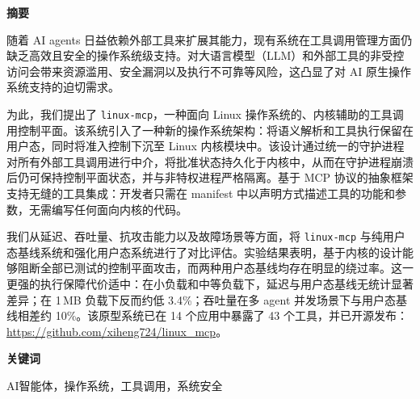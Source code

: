 \onehalfspacing
{\fontsize{16pt}{30pt}\selectfont \noindent\textbf{摘要}}
\vspace{0.7cm}
{\fontsize{12pt}{18pt}\selectfont

随着 AI agents 日益依赖外部工具来扩展其能力，现有系统在工具调用管理方面仍缺乏高效且安全的操作系统级支持。对大语言模型（LLM）和外部工具的非受控访问会带来资源滥用、安全漏洞以及执行不可靠等风险，这凸显了对 AI 原生操作系统支持的迫切需求。

为此，我们提出了 \texttt{linux-mcp}，一种面向 Linux 操作系统的、内核辅助的工具调用控制平面。该系统引入了一种新的操作系统架构：将语义解析和工具执行保留在用户态，同时将准入控制下沉至 Linux 内核模块中。该设计通过统一的守护进程对所有外部工具调用进行中介，将批准状态持久化于内核中，从而在守护进程崩溃后仍可保持控制平面状态，并与非特权进程严格隔离。基于 MCP 协议的抽象框架支持无缝的工具集成：开发者只需在 manifest 中以声明方式描述工具的功能和参数，无需编写任何面向内核的代码。

我们从延迟、吞吐量、抗攻击能力以及故障场景等方面，将 \texttt{linux-mcp} 与纯用户态基线系统和强化用户态系统进行了对比评估。实验结果表明，基于内核的设计能够阻断全部已测试的控制平面攻击，而两种用户态基线均存在明显的绕过率。这一更强的执行保障代价适中：在小负载和中等负载下，延迟与用户态基线无统计显著差异；在 1\,MB 负载下反而约低 3.4\%；吞吐量在多 agent 并发场景下与用户态基线相差约 10\%。该原型系统已在 14 个应用中暴露了 43 个工具，并已开源发布：\url{https://github.com/xiheng724/linux_mcp}。

}
\vspace{1.0cm}
{\fontsize{16pt}{30pt}\selectfont \noindent\textbf{关键词}}
\vspace{0.7cm}
{\fontsize{12pt}{18pt}\selectfont

AI智能体，操作系统，工具调用，系统安全

}
